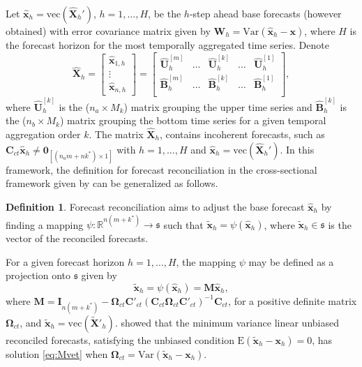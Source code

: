 \documentclass[a4paper,11pt]{article}
\newcommand{\xvet}{\bm{x}}
\newcommand{\Bvet}{\bm{B}}
\newcommand{\Cvet}{\bm{C}}
\newcommand{\Ivet}{\bm{I}}
\newcommand{\Mvet}{\bm{M}}
\newcommand{\Uvet}{\bm{U}}
\newcommand{\Xvet}{\bm{X}}
\newcommand{\Zerovet}{\bm{0}}
\newcommand{\Omegavet}{\bm{\Omega}}
\theoremstyle{definition}
\newtheorem{definition}{Definition}[section]
\begin{document}
Let $\widehat{\xvet}_{h} = \mathrm{vec}(\widehat{\Xvet}_{h}')$, $h = 1, \dots, H$, be the $h$-step ahead base forecasts (however obtained) with error covariance matrix given by $\bm{W}_h = \text{Var}(\widehat{\xvet}_h - \xvet)$, where $H$ is the forecast horizon for the most temporally aggregated time series. Denote
$$
	\widehat{\Xvet}_{h} = \begin{bmatrix}
		\widehat{\xvet}_{1,h} \\
		\vdots                \\
		\widehat{\xvet}_{n,h}
	\end{bmatrix} =\begin{bmatrix}
		\widehat{\Uvet}_{h}^{[m]} & \dots & \widehat{\Uvet}_{h}^{[k]} & \dots & \widehat{\Uvet}_{h}^{[1]} \\[0.25cm]
		\widehat{\Bvet}_{h}^{[m]} & \dots & \widehat{\Bvet}_{h}^{[k]} & \dots & \widehat{\Bvet}_{h}^{[1]} \\\end{bmatrix},
$$
where $\widehat{\Uvet}_{h}^{[k]}$ is the ($n_a\times M_k$) matrix grouping the upper time series and $\widehat{\Bvet}_{h}^{[k]}$ is the ($n_b\times M_k$) matrix grouping the bottom time series for a given temporal aggregation order $k$. The matrix $\widehat{\Xvet}_{h}$, %
contains incoherent forecasts, such as $\Cvet_{ct} \widehat{\xvet}_{h} \neq \Zerovet_{[(n_am+nk^\ast)\times1]}$
with $h = 1, \dots, H$ and $\widehat{\xvet}_{h} = \mathrm{vec}(\widehat{\Xvet}_{h}')$. In this framework, the definition for forecast reconciliation in the cross-sectional framework given by \cite{panagiotelis2021} can be generalized as follows.

\begin{definition}
	Forecast reconciliation aims to adjust the base forecast $\widehat{\xvet}_{h}$ by finding a mapping $\psi: \mathbb{R}^{n(m+k^\ast)} \rightarrow \mathfrak{s}$ such that $\widetilde{\xvet}_{h} = \psi\left(\widehat{\xvet}_{h}\right)$, where $\widetilde{\xvet}_{h} \in \mathfrak{s}$ is the vector of the reconciled forecasts.
\end{definition}

For a given forecast horizon $h = 1,\dots, H$, the mapping $\psi$ may be defined as a projection onto $\mathfrak{s}$ given by \citep{panagiotelis2021, difonzo2023}
\begin{equation}
	\label{eq:Mvet}
	\widetilde{\xvet}_{h} = \psi\left(\widehat{\xvet}_h\right) = \Mvet \widehat{\xvet}_h,
\end{equation}
where $\Mvet = \Ivet_{n(m+ k^\ast)} - \Omegavet_{ct}\Cvet'_{ct}\left(\Cvet_{ct}\Omegavet_{ct}\Cvet'_{ct}\right)^{-1}\Cvet_{ct}$, for a positive definite matrix $\Omegavet_{ct}$, and $\widetilde{\xvet}_{h} = \mathrm{vec}(\widetilde{\Xvet}'_{h})$.
\citet{wickramasuriya2019} showed that the minimum variance linear unbiased reconciled forecasts, satisfying the unbiased condition $\text{E}(\widetilde{\xvet}_h -\xvet_h) = 0$, has solution \eqref{eq:Mvet} when $\Omegavet_{ct} = \text{Var}(\widetilde{\xvet}_h -\xvet_h)$.
\end{document}
